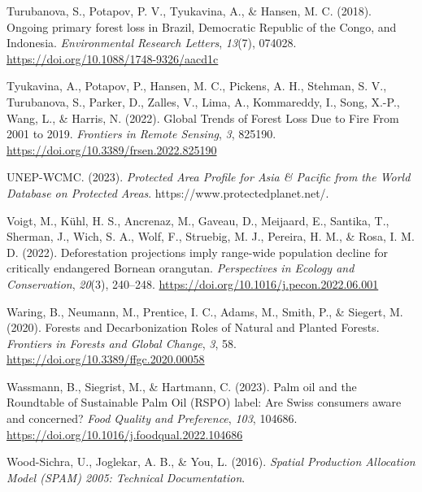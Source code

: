 \documentclass[
  letterpaper,
  DIV=11,
  numbers=noendperiod]{scrreprt}
\newlength{\cslhangindent}
\newlength{\cslentryspacingunit} %
\newenvironment{CSLReferences}[2] %
 {%
  \setlength{\parindent}{0pt}
  \ifodd #1
  \let\oldpar\par
  \def\par{\hangindent=\cslhangindent\oldpar}
  \fi
  \setlength{\parskip}{#2\cslentryspacingunit}
 }%
 {}
\begin{document}
\begin{CSLReferences}{1}{0}
\leavevmode{}%
Turubanova, S., Potapov, P. V., Tyukavina, A., \& Hansen, M. C. (2018).
Ongoing primary forest loss in {Brazil}, {Democratic Republic} of the
{Congo}, and {Indonesia}. \emph{Environmental Research Letters},
\emph{13}(7), 074028. \url{https://doi.org/10.1088/1748-9326/aacd1c}

\leavevmode{}%
Tyukavina, A., Potapov, P., Hansen, M. C., Pickens, A. H., Stehman, S.
V., Turubanova, S., Parker, D., Zalles, V., Lima, A., Kommareddy, I.,
Song, X.-P., Wang, L., \& Harris, N. (2022). Global {Trends} of {Forest
Loss Due} to {Fire From} 2001 to 2019. \emph{Frontiers in Remote
Sensing}, \emph{3}, 825190.
\url{https://doi.org/10.3389/frsen.2022.825190}

\leavevmode{}%
UNEP-WCMC. (2023). \emph{Protected {Area Profile} for {Asia} \&
{Pacific} from the {World Database} on {Protected Areas}}.
https://www.protectedplanet.net/.

\leavevmode{}%
Voigt, M., Kühl, H. S., Ancrenaz, M., Gaveau, D., Meijaard, E., Santika,
T., Sherman, J., Wich, S. A., Wolf, F., Struebig, M. J., Pereira, H. M.,
\& Rosa, I. M. D. (2022). Deforestation projections imply range-wide
population decline for critically endangered {Bornean} orangutan.
\emph{Perspectives in Ecology and Conservation}, \emph{20}(3), 240--248.
\url{https://doi.org/10.1016/j.pecon.2022.06.001}

\leavevmode{}%
Waring, B., Neumann, M., Prentice, I. C., Adams, M., Smith, P., \&
Siegert, M. (2020). Forests and {Decarbonization} \textendash{} {Roles}
of {Natural} and {Planted Forests}. \emph{Frontiers in Forests and
Global Change}, \emph{3}, 58.
\url{https://doi.org/10.3389/ffgc.2020.00058}

\leavevmode{}%
Wassmann, B., Siegrist, M., \& Hartmann, C. (2023). Palm oil and the
{Roundtable} of {Sustainable Palm Oil} ({RSPO}) label: {Are Swiss}
consumers aware and concerned? \emph{Food Quality and Preference},
\emph{103}, 104686. \url{https://doi.org/10.1016/j.foodqual.2022.104686}

\leavevmode{}%
Wood-Sichra, U., Joglekar, A. B., \& You, L. (2016). \emph{Spatial
{Production Allocation Model} ({SPAM}) 2005: {Technical Documentation}}.


\end{CSLReferences}
\end{document}
